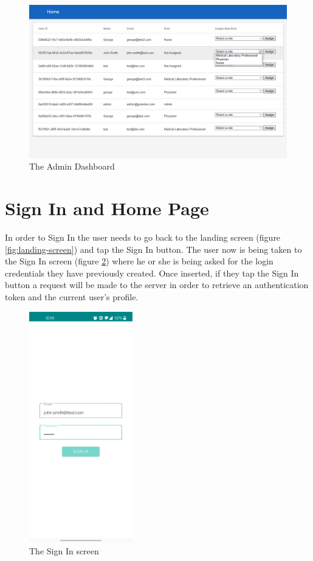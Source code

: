 \begin{figure}
\centering
\includegraphics[width=\textwidth]{figures/dashboard_assign_role.png}
\caption{The Admin Dashboard}
\label{fig:dashboard-assign-role}
\end{figure}

\section{Sign In and Home Page}
\label{sec:ch5sec2}

\par In order to Sign In the user needs to go back to the landing screen (figure \ref{fig:landing-screen}) and tap the Sign In button. The user now is being taken to the Sign In screen (figure \ref{fig:sign-in-screen}) where he or she is being asked for the login credentials they have previously created. Once inserted, if they tap the Sign In button a request will be made to the server in order to retrieve an authentication token and the current user's profile.

\begin{figure}
\centering
\includegraphics[width=0.4\textwidth]{figures/sign_in_screen.png}
\caption{The Sign In screen}
\label{fig:sign-in-screen}
\end{figure}


